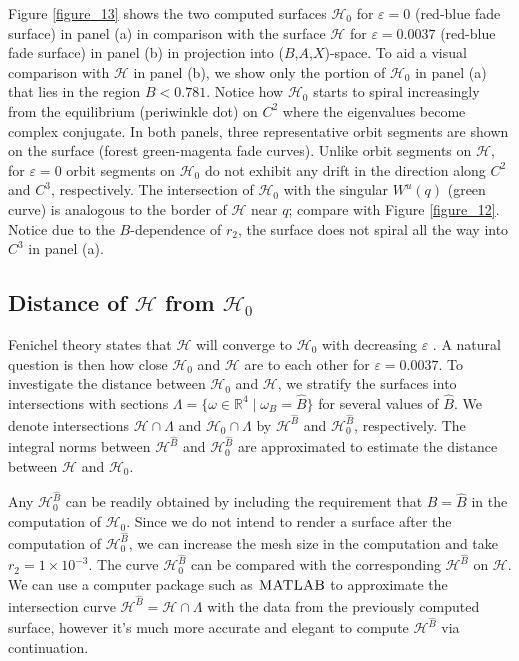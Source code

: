 \documentclass{ws-ijbc}
\begin{document}
Figure \ref{figure_13} shows the two computed surfaces $\mathscr{H}_0$ for $\varepsilon=0$ (red-blue fade surface) in panel (a) in comparison with the surface $\mathscr{H}$ for $\varepsilon=0.0037$ (red-blue fade surface) in panel (b) in projection into ($B$,$A$,$X$)-space.  To aid a visual comparison with $\mathscr{H}$ in panel (b), we show only the portion of $\mathscr{H}_0$ in panel (a) that lies in the region $B < 0.781$.  Notice how $\mathscr{H}_0$ starts to spiral increasingly from the equilibrium (periwinkle dot) on $C^2$ where the eigenvalues become complex conjugate.  In both panels, three representative orbit segments are shown on the surface (forest green-magenta fade curves).  Unlike orbit segments on $\mathscr{H}$, for $\varepsilon=0$ orbit segments on $\mathscr{H}_0$ do not exhibit any drift in the direction along $C^2$ and $C^3$, respectively.  The intersection of $\mathscr{H}_0$ with the singular $W^u(q)$ (green curve) is analogous to the border of $\mathscr{H}$ near $q$; compare with Figure \ref{figure_12}.  Notice due to the $B$-dependence of $r_2$, the surface does not spiral all the way into $C^3$ in panel (a).

\subsection{Distance of $\mathscr{H}$ from $\mathscr{H}_0$}

Fenichel theory states that $\mathscr{H}$ will converge to $\mathscr{H}_0$ with decreasing $\varepsilon$ \cite{Fenichel}.  A natural question is then how close $\mathscr{H}_0$ and $\mathscr{H}$ are to each other for $\varepsilon=0.0037$.  To investigate the distance between $\mathscr{H}_0$ and $\mathscr{H}$, we stratify the surfaces into intersections with sections $\Lambda = \{ \omega \in \mathbb{R}^4 \; | \; \omega_B = \widehat{B}\}$ for several values of $\widehat{B}$.  We denote intersections $\mathscr{H} \cap \Lambda$ and $\mathscr{H}_0 \cap \Lambda$ by $\mathscr{H}^{\widehat{B}}$ and $\mathscr{H}_0^{\widehat{B}}$, respectively.  The integral norms between $\mathscr{H}^{\widehat{B}}$ and $\mathscr{H}_0^{\widehat{B}}$ are approximated to estimate the distance between $\mathscr{H}$ and $\mathscr{H}_0$.

Any $\mathscr{H}_0^{\widehat{B}}$ can be readily obtained by including the requirement that $B=\widehat{B}$ in the computation of $\mathscr{H}_0$.  Since we do not intend to render a surface after the computation of $\mathscr{H}_0^{\widehat{B}}$, we can increase the mesh size in the computation and take $r_2=1\times10^{-3}$.  The curve $\mathscr{H}_0^{\widehat{B}}$ can be compared with the corresponding $\mathscr{H}^{\widehat{B}}$ on $\mathscr{H}$.  We can use a computer package such as $\textsc{MATLAB}$ to approximate the intersection curve $\mathscr{H}^{\widehat{B}} = \mathscr{H} \cap \Lambda$ with the data from the previously computed surface, however it's much more accurate and elegant to compute $\mathscr{H}^{\widehat{B}}$ via continuation.
\end{document}
